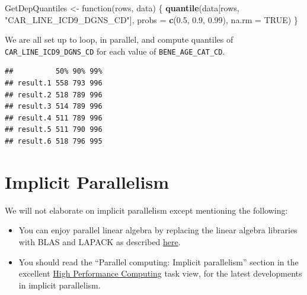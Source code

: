 \documentclass[]{book}
\newenvironment{Shaded}{\begin{snugshade}}{\end{snugshade}}
\newcommand{\KeywordTok}[1]{\textcolor[rgb]{0.13,0.29,0.53}{\textbf{{#1}}}}
\newcommand{\DataTypeTok}[1]{\textcolor[rgb]{0.13,0.29,0.53}{{#1}}}
\newcommand{\FloatTok}[1]{\textcolor[rgb]{0.00,0.00,0.81}{{#1}}}
\newcommand{\StringTok}[1]{\textcolor[rgb]{0.31,0.60,0.02}{{#1}}}
\newcommand{\OtherTok}[1]{\textcolor[rgb]{0.56,0.35,0.01}{{#1}}}
\newcommand{\NormalTok}[1]{{#1}}
\providecommand{\tightlist}{%
  \setlength{\itemsep}{0pt}\setlength{\parskip}{0pt}}
\theoremstyle{definition}
\theoremstyle{definition}
\theoremstyle{remark}
\begin{document}
\begin{Shaded}
\begin{Highlighting}[]
\NormalTok{GetDepQuantiles <-}\StringTok{ }\NormalTok{function(rows, data) \{}
 \KeywordTok{quantile}\NormalTok{(data[rows, }\StringTok{"CAR_LINE_ICD9_DGNS_CD"}\NormalTok{], }\DataTypeTok{probs =} \KeywordTok{c}\NormalTok{(}\FloatTok{0.5}\NormalTok{, }\FloatTok{0.9}\NormalTok{, }\FloatTok{0.99}\NormalTok{),}
 \DataTypeTok{na.rm =} \OtherTok{TRUE}\NormalTok{)}
\NormalTok{\}}
\end{Highlighting}
\end{Shaded}

We are all set up to loop, in parallel, and compute quantiles of
\texttt{CAR\_LINE\_ICD9\_DGNS\_CD} for each value of
\texttt{BENE\_AGE\_CAT\_CD}.

\begin{Shaded}
\end{Shaded}

\begin{verbatim}
##          50% 90% 99%
## result.1 558 793 996
## result.2 518 789 996
## result.3 514 789 996
## result.4 511 789 996
## result.5 511 790 996
## result.6 518 796 995
\end{verbatim}

\section{Implicit Parallelism}\label{implicit-parallelism}

We will not elaborate on implicit parallelism except mentioning the
following:

\begin{itemize}
\tightlist
\item
  You can enjoy parallel linear algebra by replacing the linear algebra
  libraries with BLAS and LAPACK as described
  \href{https://www.r-bloggers.com/faster-r-through-better-blas/}{here}.
\item
  You should read the ``Parallel computing: Implicit parallelism''
  section in the excellent
  \href{https://cran.r-project.org/web/views/HighPerformanceComputing.html}{High
  Performance Computing} task view, for the latest developments in
  implicit parallelism.
\end{itemize}
\end{document}
